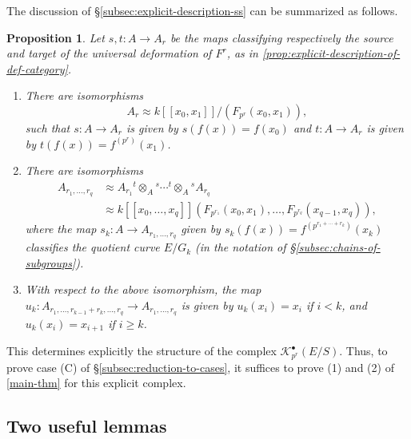 \documentclass[11pt]{amsart}
\numberwithin{equation}{section}
\theoremstyle{plain}
\newtheorem{prop}[subsection]{Proposition}
\theoremstyle{remark}
\theoremstyle{plain}
\begin{document}
The discussion of \S\ref{subsec:explicit-description-ss} can be
summarized as follows. 
\begin{prop}\label{prop:description-of-complex-ss}
Let $s,t\colon A{\rightarrow} A_r$ be the maps classifying respectively the
source and target of the universal deformation of $F^r$, as in
\eqref{prop:explicit-description-of-def-category}. 
\begin{enumerate}
\item There are isomorphisms
\[
A_r\approx k{[\![{x_0,x_1}]\!]}/(F_{p^r}(x_0,x_1)),
\]
such that $s\colon A{\rightarrow} A_r$ is given by $s(f(x))=f(x_0)$ and $t\colon
A{\rightarrow} A_r$ is given by $t(f(x))=f^{(p^r)}(x_1)$. 

\item 
There are isomorphisms
\begin{align*}
  A_{r_1,\dots,r_q} &\approx A_{r_1}{}^t\!\otimes_A\!{}^s\cdots
  {}^t\!\otimes_A \!{}^s A_{r_q}
\\
&\approx k{[\![{x_0,\dots,x_q}]\!]}(F_{p^{r_1}}(x_0,x_1),\dots,
F_{p^{r_q}}(x_{q-1},x_q)),
\end{align*}
where the map $s_k\colon A{\rightarrow} A_{r_1,\dots,r_q}$ given by
$s_k(f(x))=f^{(p^{r_1+\cdots+r_k})}(x_k)$ classifies the quotient
curve $E/G_k$ (in the notation of
\S\ref{subsec:chains-of-subgroups}).

\item 
With respect to the above isomorphism, the map $u_k\colon
A_{r_1,\dots,r_{k-1}+r_k,\dots,r_q}{\rightarrow} 
A_{r_1,\dots, r_q}$ is given by $u_k(x_i)=x_i$ if $i<k$, and
$u_k(x_i)=x_{i+1}$ if $i\geq k$.
\end{enumerate}
\end{prop}

This determines explicitly the structure of the complex
${\mathscr{K}}^\bullet_{p^r}(E/S)$.  
Thus, to prove case (C) of \S\ref{subsec:reduction-to-cases}, it suffices to prove (1) and (2) of
\eqref{main-thm} for this 
explicit complex.  

\subsection{Two useful lemmas}
\end{document}
